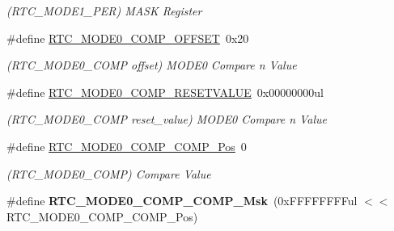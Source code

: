 \begin{DoxyCompactItemize}
\begin{DoxyCompactList}\small\item\em (R\+T\+C\+\_\+\+M\+O\+D\+E1\+\_\+\+P\+E\+R) M\+A\+S\+K Register \end{DoxyCompactList}\item 
\hypertarget{group___s_a_m_l21___r_t_c_ga863822dc2472d786a26a0f9d56229323}{}\#define \hyperlink{group___s_a_m_l21___r_t_c_ga863822dc2472d786a26a0f9d56229323}{R\+T\+C\+\_\+\+M\+O\+D\+E0\+\_\+\+C\+O\+M\+P\+\_\+\+O\+F\+F\+S\+E\+T}~0x20\label{group___s_a_m_l21___r_t_c_ga863822dc2472d786a26a0f9d56229323}

\begin{DoxyCompactList}\small\item\em (R\+T\+C\+\_\+\+M\+O\+D\+E0\+\_\+\+C\+O\+M\+P offset) M\+O\+D\+E0 Compare n Value \end{DoxyCompactList}\item 
\hypertarget{group___s_a_m_l21___r_t_c_ga5ed458983c2db36a3348c4c62ee33cda}{}\#define \hyperlink{group___s_a_m_l21___r_t_c_ga5ed458983c2db36a3348c4c62ee33cda}{R\+T\+C\+\_\+\+M\+O\+D\+E0\+\_\+\+C\+O\+M\+P\+\_\+\+R\+E\+S\+E\+T\+V\+A\+L\+U\+E}~0x00000000ul\label{group___s_a_m_l21___r_t_c_ga5ed458983c2db36a3348c4c62ee33cda}

\begin{DoxyCompactList}\small\item\em (R\+T\+C\+\_\+\+M\+O\+D\+E0\+\_\+\+C\+O\+M\+P reset\+\_\+value) M\+O\+D\+E0 Compare n Value \end{DoxyCompactList}\item 
\hypertarget{group___s_a_m_l21___r_t_c_gad11fc5534c701be32db4687720ce549e}{}\#define \hyperlink{group___s_a_m_l21___r_t_c_gad11fc5534c701be32db4687720ce549e}{R\+T\+C\+\_\+\+M\+O\+D\+E0\+\_\+\+C\+O\+M\+P\+\_\+\+C\+O\+M\+P\+\_\+\+Pos}~0\label{group___s_a_m_l21___r_t_c_gad11fc5534c701be32db4687720ce549e}

\begin{DoxyCompactList}\small\item\em (R\+T\+C\+\_\+\+M\+O\+D\+E0\+\_\+\+C\+O\+M\+P) Compare Value \end{DoxyCompactList}\item 
\hypertarget{group___s_a_m_l21___r_t_c_ga2818a3f8e81af4f5a8a5acc3732191b6}{}\#define {\bfseries R\+T\+C\+\_\+\+M\+O\+D\+E0\+\_\+\+C\+O\+M\+P\+\_\+\+C\+O\+M\+P\+\_\+\+Msk}~(0x\+F\+F\+F\+F\+F\+F\+F\+Ful $<$$<$ R\+T\+C\+\_\+\+M\+O\+D\+E0\+\_\+\+C\+O\+M\+P\+\_\+\+C\+O\+M\+P\+\_\+\+Pos)\label{group___s_a_m_l21___r_t_c_ga2818a3f8e81af4f5a8a5acc3732191b6}


\end{DoxyCompactItemize}
